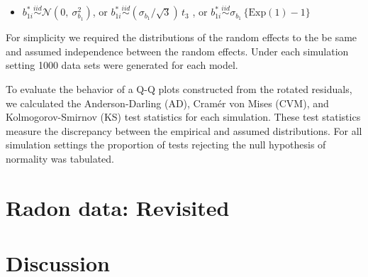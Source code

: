 \documentclass{article} %
\newcommand{\al}[1]{{\color{red} #1}}
\newcommand{\trans}{\ensuremath{^\prime}}
\begin{document}
{\begin{itemize}
\item $b_{1i}^* \overset{iid}{\sim} \mathcal{N}(0, \ \sigma^2_{b_{1}})$, or $b_{1i}^* \overset{iid}{\sim} (\sigma_{b_{1}} / \sqrt{3})\, t_3$ , or $b_{1i}^* \overset{iid}{\sim} \sigma_{b_{1}} \, \{ \text{Exp}(1) - 1 \}$
\end{itemize}
%
For simplicity we required the distributions of the random effects to the be same and assumed independence between the random effects. Under each simulation setting 1000 data sets were generated for each model.

To evaluate the behavior of a Q-Q plots constructed from the rotated residuals, we calculated the Anderson-Darling (AD), Cram{\'e}r von Mises (CVM), and Kolmogorov-Smirnov (KS) test statistics for each simulation. These test statistics measure the discrepancy between the empirical and assumed distributions. For all simulation settings the proportion of tests rejecting the null hypothesis of normality was tabulated. 
}


\section{Radon data: Revisited}\label{sec:radon2}


\section{Discussion}\label{sec:discussion}


\clearpage
{}

\end{document}
